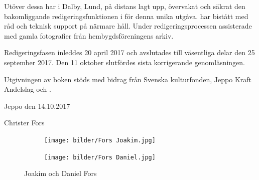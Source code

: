 Utöver dessa har  i Dalby, Lund, på distans lagt upp, övervakat och säkrat den bakomliggande redigeringsfunktionen i  \XeLaTeX  för denna unika utgåva.  har bistått med råd och teknisk support på närmare håll. Under redigeringsprocessen assisterade  med gamla fotografier från hembygdsföreningens arkiv.

Redigeringsfasen inleddes 20 april 2017 och avslutades till väsentliga delar den 25 september 2017. Den 11 oktober slutfördes sista korrigerande genomläsningen.

Utgivningen av boken stöds med bidrag från Svenska kulturfonden, Jeppo Kraft Andelslag och .

Jeppo den 14.10.2017

Christer Fors



\begin{figure}
  \centering
  \begin{subfigure}{0.3\textwidth}
    \centering
    \texttt{[image: bilder/Fors Joakim.jpg]}
  \end{subfigure}
  \begin{subfigure}{0.3\textwidth}
    \centering
    \texttt{[image: bilder/Fors Daniel.jpg]}
  \end{subfigure}
  \caption{Joakim och Daniel Fors}
\end{figure}


\clearpage
{}

